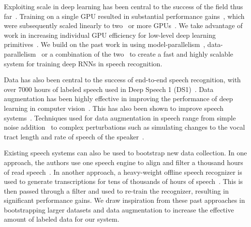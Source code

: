 Exploiting scale in deep learning has been central to the success of the field
thus far~\cite{krizhevsky2012imagenet, le2013}. Training on a single GPU
resulted in substantial performance gains~\cite{raina2009}, which were
subsequently scaled linearly to two~\cite{krizhevsky2012imagenet} or more
GPUs~\cite{coates2013cotshpc}. We take advantage of work in increasing
individual GPU efficiency for low-level deep learning
primitives~\cite{chetlur14}. We build on the past work in using
model-parallelism~\cite{coates2013cotshpc}, data-parallelism~\cite{dean2012} or
a combination of the two~\cite{szegedy2015, hannun2014deepspeech} to create a
fast and highly scalable system for training deep RNNs in speech recognition.

Data has also been central to the success of end-to-end speech recognition,
with over 7000 hours of labeled speech used in Deep Speech 1
(DS1)~\cite{hannun2014deepspeech}. Data augmentation has been highly effective
in improving the performance of deep learning in computer
vision~\cite{lecun2004, sapp2008, coates2011}. This has also been shown to
improve speech systems~\cite{gales2009, hannun2014deepspeech}. Techniques used
for data augmentation in speech range from simple noise
addition~\cite{hannun2014deepspeech} to complex perturbations such as
simulating changes to the vocal tract length and rate of speech of the
speaker~\cite{jaitly2013, ko2015}.

Existing speech systems can also be used to bootstrap new data collection. In
one approach, the authors use one speech engine to align and filter a thousand
hours of read speech~\cite{panayotov2015}. In another approach, a heavy-weight
offline speech recognizer is used to generate transcriptions for tens of
thousands of hours of speech~\cite{kapralova2014}. This is then passed through
a filter and used to re-train the recognizer, resulting in significant
performance gains. We draw inspiration from these past approaches in
bootstrapping larger datasets and data augmentation to increase the effective
amount of labeled data for our system.
